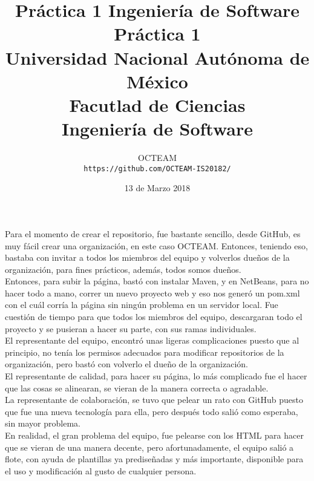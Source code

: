 \documentclass[11pt,letterpaper]{article}
\title{Práctica 1 Ingeniería de Software}
\begin{document}
\title{\vspace{-1.5cm}
	Práctica 1\\
    \large Universidad Nacional Autónoma de México\\
    Facutlad de Ciencias\\
    Ingeniería de Software\\
}
\author{
	OCTEAM\\
    \texttt{https://github.com/OCTEAM-IS20182/}
    }
\date{13 de Marzo 2018}
\maketitle

Para el momento de crear el repositorio, fue bastante sencillo, desde GitHub, es muy fácil crear una organización, en este caso OCTEAM. Entonces, teniendo eso, bastaba con invitar a todos los miembros del equipo y volverlos dueños de la organización, para fines prácticos, además, todos somos dueños.\\

Entonces, para subir la página, bastó con instalar Maven, y en NetBeans, para no hacer todo a mano, correr un nuevo proyecto web y eso nos generó un pom.xml con el cuál corría la página sin ningún problema en un servidor local. Fue cuestión de tiempo para que todos los miembros del equipo, descargaran todo el proyecto y se pusieran a hacer su parte, con sus ramas individuales.\\

El representante del equipo, encontró unas ligeras complicaciones puesto que al principio, no tenía los permisos adecuados para modificar repositorios de la organización, pero bastó con volverlo el dueño de la organización.\\

El representante de calidad, para hacer su página, lo más complicado fue el hacer que las cosas se alinearan, se vieran de la manera correcta o agradable.\\

La representante de colaboración, se tuvo que pelear un rato con GitHub puesto que fue una nueva tecnología para ella, pero después todo salió como esperaba, sin mayor problema.\\

En realidad, el gran problema del equipo, fue pelearse con los HTML para hacer que se vieran de una manera decente, pero afortunadamente, el equipo salió a flote, con ayuda de plantillas ya prediseñadas y más importante, disponible para el uso y modificación al gusto de cualquier persona.\\
\end{document}
